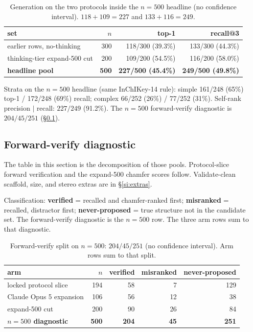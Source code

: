 \begin{table}[ht]
\caption{Generation on the two protocols inside the $n{=}500$ headline
(no confidence interval).
$118+109=227$ and $133+116=249$.}
\centering
\small
\begin{tabular}{@{}lrrr@{}}
\toprule
set & $n$ & top-1 & recall@3 \\
\midrule
earlier rows, no-thinking & 300 & 118/300 (39.3\%) & 133/300 (44.3\%) \\
thinking-tier expand-500 cut & 200 & 109/200 (54.5\%) & 116/200 (58.0\%) \\
\textbf{headline pool} & \textbf{500} & \textbf{227/500 (45.4\%)} & \textbf{249/500 (49.8\%)} \\
\bottomrule
\end{tabular}
\end{table}

Strata on the $n{=}500$ headline (same InChIKey-14 rule):
simple 161/248 (65\%) top-1 / 172/248 (69\%) recall;
complex 66/252 (26\%) / 77/252 (31\%).
Self-rank precision $|$ recall: $227/249$ (91.2\%).
The $n{=}500$ forward-verify diagnostic is $204/45/251$ (\S\ref{si:fverify}).

\subsection{Forward-verify diagnostic}
\label{si:fverify}

The table in this section is the decomposition of those pools.
Protocol-slice forward verification and the expand-500 chamfer scores
follow.
Validate-clean scaffold, size, and stereo extras are in \S\ref{si:extras}.

Classification:
\textbf{verified} = recalled and chamfer-ranked first;
\textbf{misranked} = recalled, distractor first;
\textbf{never-proposed} = true structure not in the candidate set.
The forward-verify diagnostic is the $n{=}500$ row.
The three arm rows sum to that diagnostic.

\begin{table}[ht]
\caption{Forward-verify split on $n{=}500$: $204/45/251$
(no confidence interval).
Arm rows sum to that split.}
\centering
\small
\begin{tabular}{@{}lrrrr@{}}
\toprule
arm & $n$ & verified & misranked & never-proposed \\
\midrule
locked protocol slice & 194 & 58 & 7 & 129 \\
Claude Opus 5 expansion & 106 & 56 & 12 & 38 \\
expand-500 cut & 200 & 90 & 26 & 84 \\
\textbf{$n{=}500$ diagnostic} & \textbf{500} & \textbf{204} & \textbf{45} & \textbf{251} \\
\bottomrule
\end{tabular}
\end{table}

